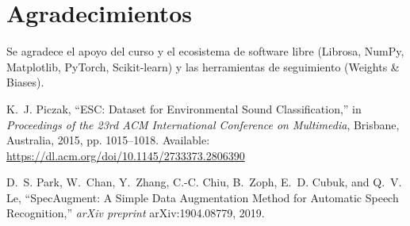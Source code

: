 \documentclass[conference]{IEEEtran}
\begin{document}
\section*{Agradecimientos}
Se agradece el apoyo del curso y el ecosistema de software libre (Librosa, NumPy, Matplotlib, PyTorch, Scikit-learn) y las herramientas de seguimiento (Weights \& Biases).

\begin{thebibliography}{00}

K.~J. Piczak, ``ESC: Dataset for Environmental Sound Classification,''
in \emph{Proceedings of the 23rd ACM International Conference on Multimedia},
Brisbane, Australia, 2015, pp. 1015--1018. Available: \url{https://dl.acm.org/doi/10.1145/2733373.2806390}

D.~S. Park, W.~Chan, Y.~Zhang, C.-C. Chiu, B.~Zoph, E.~D. Cubuk, and Q.~V. Le,
``SpecAugment: A Simple Data Augmentation Method for Automatic Speech Recognition,''
\emph{arXiv preprint} arXiv:1904.08779, 2019.

\end{thebibliography}
\end{document}
